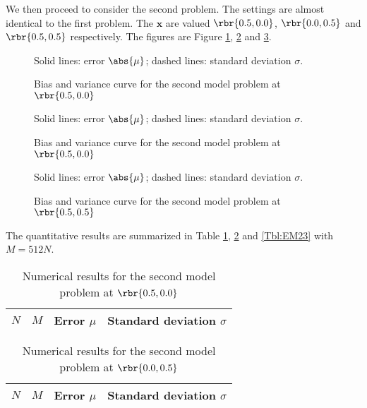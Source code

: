 \documentclass[english, nochinese]{pnote}
\begin{document}
We then proceed to consider the second problem. The settings are almost identical to the first problem. The $\bm{x}$ are valued $ \rbr{ 0.5, 0.0 } $, $ \rbr{ 0.0, 0.5 } $ and $ \rbr{ 0.5, 0.5 } $ respectively. The figures are Figure \ref{Fig:EM21}, \ref{Fig:EM22} and \ref{Fig:EM23}.

\begin{figure}[htbp]
{
\centering

\caption{Bias and variance curve for the second model problem at $ \rbr{ 0.5, 0.0 } $}
\label{Fig:EM21}
}
{
\footnotesize Solid lines: error $\abs{\mu}$; dashed lines: standard deviation $\sigma$.
}
\end{figure}

\begin{figure}[htbp]
{
\centering

\caption{Bias and variance curve for the second model problem at $ \rbr{ 0.5, 0.0 } $}
\label{Fig:EM22}
}
{
\footnotesize Solid lines: error $\abs{\mu}$; dashed lines: standard deviation $\sigma$.
}
\end{figure}

\begin{figure}[htbp]
{
\centering

\caption{Bias and variance curve for the second model problem at $ \rbr{ 0.5, 0.5 } $}
\label{Fig:EM23}
}
{
\footnotesize Solid lines: error $\abs{\mu}$; dashed lines: standard deviation $\sigma$.
}
\end{figure}

The quantitative results are summarized in Table \ref{Tbl:EM21}, \ref{Tbl:EM22} and \ref{Tbl:EM23} with $ M = 512 N $.

\begin{table}[htbp]
\centering
\begin{tabular}{|c|c|c|c|}
\hline
$N$ & $M$ & Error $\mu$ & Standard deviation $\sigma$ \\
\hline

\end{tabular}
\caption{Numerical results for the second model problem at $ \rbr{ 0.5, 0.0 } $}
\label{Tbl:EM21}
\end{table}

\begin{table}[htbp]
\centering
\begin{tabular}{|c|c|c|c|}
\hline
$N$ & $M$ & Error $\mu$ & Standard deviation $\sigma$ \\
\hline

\end{tabular}
\caption{Numerical results for the second model problem at $ \rbr{ 0.0, 0.5 } $}
\label{Tbl:EM22}
\end{table}
\end{document}
